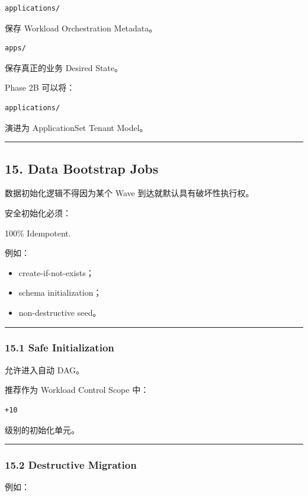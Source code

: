 \documentclass[11pt,a4paper]{article}
\begin{document}
\begin{lstlisting}[language=text]
applications/
\end{lstlisting}
保存 Workload Orchestration Metadata。

\begin{lstlisting}[language=text]
apps/
\end{lstlisting}
保存真正的业务 Desired State。

Phase 2B 可以将：

\begin{lstlisting}[language=text]
applications/
\end{lstlisting}
演进为 ApplicationSet Tenant Model。

\vspace{0.5em}\hrule\vspace{0.5em}
\subsection{15. Data Bootstrap Jobs}
数据初始化逻辑不得因为某个 Wave 到达就默认具有破坏性执行权。

安全初始化必须：

\begin{gfmBlockquote}
100\% Idempotent.
\end{gfmBlockquote}
例如：

\begin{itemize}
  \item create-if-not-exists；
  \item schema initialization；
  \item non-destructive seed。
\end{itemize}
\vspace{0.5em}\hrule\vspace{0.5em}
\subsubsection{15.1 Safe Initialization}
允许进入自动 DAG。

推荐作为 Workload Control Scope 中：

\begin{lstlisting}[language=text]
+10
\end{lstlisting}
级别的初始化单元。

\vspace{0.5em}\hrule\vspace{0.5em}
\subsubsection{15.2 Destructive Migration}
例如：
\end{document}
